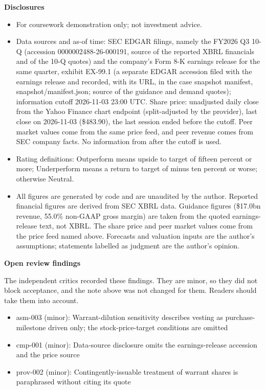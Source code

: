 \documentclass[a4paper,10pt]{article}
\begin{document}
\par\smallskip\textbf{\color{MemoBlue}Disclosures}\par

\begin{itemize}\setlength{\itemsep}{1pt}
\item For coursework demonstration only; not investment advice.
\item Data sources and as-of time: SEC EDGAR filings, namely the FY2026 Q3 10-Q (accession 0000002488-26-000191, source of the reported XBRL financials and of the 10-Q quotes) and the company's Form 8-K earnings release for the same quarter, exhibit EX-99.1 (a separate EDGAR accession filed with the earnings release and recorded, with its URL, in the case snapshot manifest, snapshot/manifest.json; source of the guidance and demand quotes); information cutoff 2026-11-03 23:00 UTC. Share price: unadjusted daily close from the Yahoo Finance chart endpoint (split-adjusted by the provider), last close on 2026-11-03 (\$483.90), the last session ended before the cutoff. Peer market values come from the same price feed, and peer revenue comes from SEC company facts. No information from after the cutoff is used.
\item Rating definitions: Outperform means upside to target of fifteen percent or more; Underperform means a return to target of minus ten percent or worse; otherwise Neutral.
\item All figures are generated by code and are unaudited by the author. Reported financial figures are derived from SEC XBRL data. Guidance figures (\$17.0bn revenue, 55.0\% non-GAAP gross margin) are taken from the quoted earnings-release text, not XBRL. The share price and peer market values come from the price feed named above. Forecasts and valuation inputs are the author's assumptions; statements labelled as judgment are the author's opinion.
\end{itemize}

\par\smallskip\textbf{\color{MemoBlue}Open review findings}\par

The independent critics recorded these findings. They are minor, so they did not block acceptance, and the note above was not changed for them. Readers should take them into account.

\begin{itemize}\setlength{\itemsep}{1pt}
\item asm-003 (minor): Warrant-dilution sensitivity describes vesting as purchase-milestone driven only; the stock-price-target conditions are omitted
\item cmp-001 (minor): Data-source disclosure omits the earnings-release accession and the price source
\item prov-002 (minor): Contingently-issuable treatment of warrant shares is paraphrased without citing its quote
\end{itemize}
\end{document}
